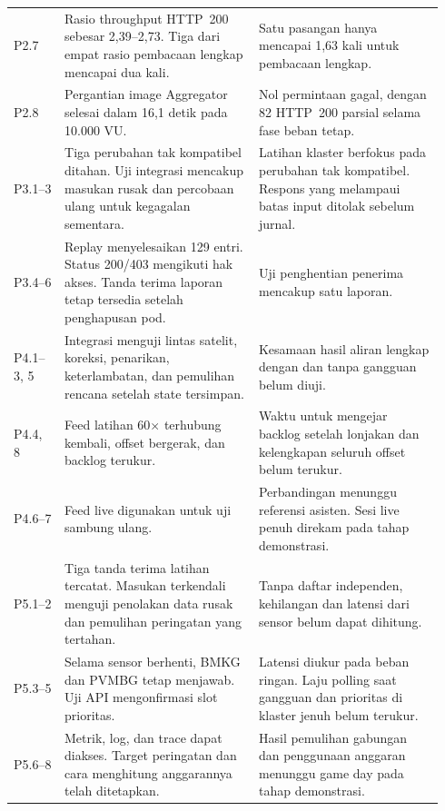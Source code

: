 {\begin{longtable}{@{}>{\raggedright\arraybackslash}p{0.115\linewidth}>{\raggedright\arraybackslash}p{0.42\linewidth}>{\raggedright\arraybackslash}p{0.40\linewidth}@{}}
P2.7 & Rasio throughput HTTP~200 sebesar 2{,}39--2{,}73. Tiga dari empat rasio pembacaan lengkap mencapai dua kali. & Satu pasangan hanya mencapai 1{,}63 kali untuk pembacaan lengkap. \\
P2.8 & Pergantian image Aggregator selesai dalam 16{,}1 detik pada 10.000 VU. & Nol permintaan gagal, dengan 82 HTTP~200 parsial selama fase beban tetap. \\
\addlinespace
P3.1--3 & Tiga perubahan tak kompatibel ditahan. Uji integrasi mencakup masukan rusak dan percobaan ulang untuk kegagalan sementara. & Latihan klaster berfokus pada perubahan tak kompatibel. Respons yang melampaui batas input ditolak sebelum jurnal. \\
P3.4--6 & Replay menyelesaikan 129 entri. Status 200/403 mengikuti hak akses. Tanda terima laporan tetap tersedia setelah penghapusan pod. & Uji penghentian penerima mencakup satu laporan. \\
\addlinespace
P4.1--3, 5 & Integrasi menguji lintas satelit, koreksi, penarikan, keterlambatan, dan pemulihan rencana setelah state tersimpan. & Kesamaan hasil aliran lengkap dengan dan tanpa gangguan belum diuji. \\
P4.4, 8 & Feed latihan 60$\times$ terhubung kembali, offset bergerak, dan backlog terukur. & Waktu untuk mengejar backlog setelah lonjakan dan kelengkapan seluruh offset belum terukur. \\
P4.6--7 & Feed live digunakan untuk uji sambung ulang. & Perbandingan menunggu referensi asisten. Sesi live penuh direkam pada tahap demonstrasi. \\
\addlinespace
P5.1--2 & Tiga tanda terima latihan tercatat. Masukan terkendali menguji penolakan data rusak dan pemulihan peringatan yang tertahan. & Tanpa daftar independen, kehilangan dan latensi dari sensor belum dapat dihitung. \\
P5.3--5 & Selama sensor berhenti, BMKG dan PVMBG tetap menjawab. Uji API mengonfirmasi slot prioritas. & Latensi diukur pada beban ringan. Laju polling saat gangguan dan prioritas di klaster jenuh belum terukur. \\
P5.6--8 & Metrik, log, dan trace dapat diakses. Target peringatan dan cara menghitung anggarannya telah ditetapkan. & Hasil pemulihan gabungan dan penggunaan anggaran menunggu game day pada tahap demonstrasi. \\
\end{longtable}
}
